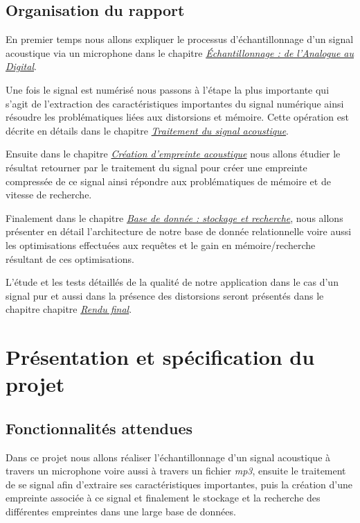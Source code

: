 \documentclass[11pt, report, french]{scrreprt}
\begin{document}
\section{Organisation du rapport}
En premier temps nous allons expliquer le processus d'échantillonnage d'un signal acoustique via un microphone dans le chapitre  \hyperref[sampling]{\textit{Échantillonnage : de l'Analogue au Digital}}.\\\par
Une fois le signal est numérisé nous passons à l'étape la plus importante qui s'agit de l'extraction des caractéristiques importantes du signal numérique ainsi résoudre les problématiques liées aux distorsions et mémoire. Cette opération est décrite en détails dans le chapitre \hyperref[dsp]{\textit{Traitement du signal acoustique}}.\\\par

Ensuite dans le chapitre \hyperref[hash]{\textit{Création d'empreinte acoustique}} nous allons étudier le résultat retourner par le traitement du signal pour créer une empreinte compressée de ce signal ainsi répondre aux problématiques de mémoire et de vitesse de recherche.\\\par

Finalement dans le chapitre \hyperref[bdd]{\textit{Base de donnée : stockage et recherche}}, nous allons présenter en détail l'architecture de notre base de donnée relationnelle voire aussi les optimisations effectuées aux requêtes et le gain en mémoire/recherche résultant de ces optimisations.\\\par

L'étude et les tests détaillés de la qualité de notre application dans le cas d'un signal pur et aussi dans la présence des distorsions seront présentés dans le chapitre chapitre \hyperref[rf]{\textit{Rendu final}}.

\chapter{Présentation et spécification du projet}
\section{Fonctionnalités attendues}
Dans ce projet nous allons réaliser l'échantillonnage d'un signal acoustique à travers un microphone voire aussi à travers un fichier \textit{mp3}, ensuite le traitement de se signal afin d'extraire ses caractéristiques importantes, puis la création d'une empreinte associée à ce signal et finalement le stockage et la recherche des différentes empreintes dans une large base de données.\\\par
\end{document}
